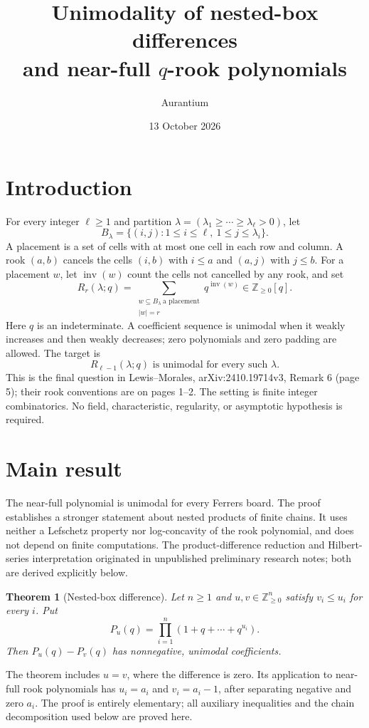 \documentclass[11pt]{article}
\title{Unimodality of nested-box differences\\
and near-full $q$-rook polynomials}
\author{Aurantium}
\date{13 October 2026}
\newtheorem{theorem}{Theorem}
\newcommand{\NN}{\mathbb Z_{\ge0}}
\newcommand{\inv}{\operatorname{inv}}
\begin{document}
\maketitle
\thispagestyle{fancy}

\section*{Introduction}
For every integer $\ell\ge1$ and partition
$\lambda=(\lambda_1\ge\cdots\ge\lambda_\ell>0)$, let
\[
 B_\lambda=\{(i,j):1\le i\le\ell,\ 1\le j\le\lambda_i\}.
\]
A placement is a set of cells with at most one cell in each row and column.
A rook $(a,b)$ cancels the cells $(i,b)$ with $i\le a$ and $(a,j)$ with
$j\le b$. For a placement $w$, let $\inv(w)$ count the cells not cancelled
by any rook, and set
\[
 R_r(\lambda;q)=\sum_{\substack{w\subseteq B_\lambda\ \text{a placement}\\ |w|=r}}
 q^{\inv(w)}\in\NN[q].
\]
Here $q$ is an indeterminate. A coefficient sequence is unimodal when it
weakly increases and then weakly decreases; zero polynomials and zero
padding are allowed. The target is
\[
 \boxed{R_{\ell-1}(\lambda;q)\text{ is unimodal for every such }\lambda.}
\]
This is the final question in Lewis--Morales, arXiv:2410.19714v3,
Remark 6 (page 5); their rook conventions are on pages 1--2.
The setting is finite integer combinatorics. No field, characteristic,
regularity, or asymptotic hypothesis is required.

\section*{Main result}
The near-full polynomial is unimodal for every Ferrers board. The proof
establishes a stronger statement about nested products of finite chains.
It uses neither a Lefschetz property nor log-concavity of the rook polynomial,
and does not depend on finite computations. The product-difference reduction
and Hilbert-series interpretation originated in unpublished preliminary
research notes; both are derived explicitly below.

\begin{theorem}[Nested-box difference]\label{thm:boxes}
Let $n\ge1$ and $u,v\in\NN^n$ satisfy $v_i\le u_i$ for every $i$. Put
\[
 P_u(q)=\prod_{i=1}^n(1+q+\cdots+q^{u_i}).
\]
Then $P_u(q)-P_v(q)$ has nonnegative, unimodal coefficients.
\end{theorem}
The theorem includes $u=v$, where the difference is zero. Its application to
near-full rook polynomials has $u_i=a_i$ and $v_i=a_i-1$, after separating
negative and zero $a_i$. The proof is entirely elementary; all auxiliary
inequalities and the chain decomposition used below are proved here.
\end{document}
